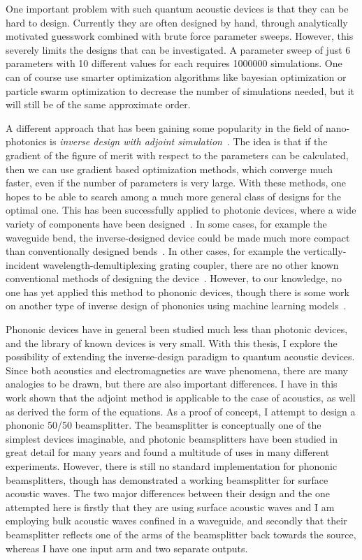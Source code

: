 One important problem with such quantum acoustic devices is that they can be hard to design.
Currently they are often designed by hand,
through analytically motivated guesswork combined with brute force parameter
sweeps.
However, this severely limits the designs that can be investigated.
A parameter sweep of just 6 parameters with 10 different values for each
requires \num{1000000} simulations.
One can of course use smarter optimization algorithms like bayesian optimization
or particle swarm optimization\cite{schneider2019benchmarking,zhang_compact_2013}
to decrease the number of simulations needed, but it will still be of the
same approximate order.

A different approach that has been gaining some popularity in the field of
nano-photonics is \emph{inverse design with adjoint
simulation}~\cite{molesky_inverse_2018}.
The idea is that if the gradient of the figure of merit
with respect to the parameters can be calculated, then we can use gradient based
optimization methods, which converge much faster, even if the number of
parameters is very large. With these methods, one hopes to be able to search
among a much more general class of designs for the optimal one.
This has been successfully applied to photonic devices,
where a wide variety of components have been designed~\cite{spins2019}.
In some cases, for example the waveguide bend, the inverse-designed device could
be made much more compact than conventionally designed
bends~\cite{jensen_systematic_2004}.
In other cases, for example the vertically-incident wavelength-demultiplexing
grating coupler, there are no other known conventional methods of designing the
device~\cite{piggott_inverse_2014}.
However, to our knowledge, no one has yet applied this method to phononic
devices, though there is some work on another type of inverse design of
phononics using machine learning models~\cite{han_deep-learning-based_2022}.


Phononic devices have in general been studied much less than photonic
devices, and the library of known devices is very small.
With this thesis, I explore the possibility of extending the inverse-design paradigm to
quantum acoustic devices.
Since both acoustics and electromagnetics are wave phenomena, there are many
analogies to be drawn, but there are also important differences.
I have in this work shown that the adjoint method is applicable to the case of
acoustics, as well as derived the form of the equations.
As a proof of concept, I attempt to design a phononic 50/50 beamsplitter.
The beamsplitter is conceptually one of the simplest devices imaginable,
and photonic beamsplitters have been studied in great detail for many years
and found a multitude of uses in many different experiments.
However, there is still no standard implementation for phononic beamsplitters,
though \cite{qiao2023developing} has demonstrated a working beamsplitter for
surface acoustic waves.
The two major differences between their design and the one attempted here is
firstly that they are using surface acoustic waves and I am employing bulk
acoustic waves confined in a waveguide, and secondly that their beamsplitter
reflects one of the arms of the beamsplitter back towards the source, whereas I
have one input arm and two separate outputs.

